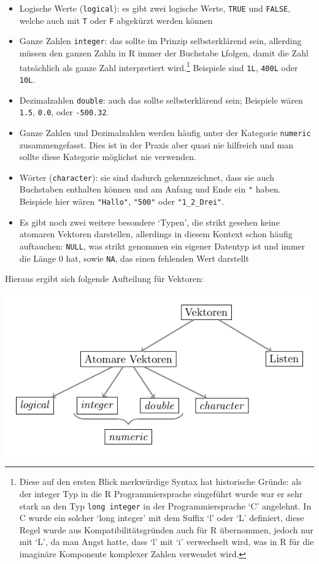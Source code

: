 \documentclass[]{tufte-book}
\providecommand{\tightlist}{%
  \setlength{\itemsep}{0pt}\setlength{\parskip}{0pt}}
\begin{document}
\begin{itemize}
\tightlist
\item
  Logische Werte (\texttt{logical}): es gibt zwei logische Werte,
  \texttt{TRUE} und \texttt{FALSE}, welche auch mit \texttt{T} oder
  \texttt{F} abgekürzt werden können
\item
  Ganze Zahlen \texttt{integer}: das sollte im Prinzip selbsterklärend
  sein, allerding müssen den ganzen Zahln in R immer der Buchstabe
  \texttt{L}folgen, damit die Zahl tatsächlich als ganze Zahl
  interpretiert wird.\footnote{Diese auf den ersten Blick merkwürdige
    Syntax hat historische Gründe: als der integer Typ in die R
    Programmiersprache eingeführt wurde war er sehr stark an den Typ
    \texttt{long\ integer} in der Programmiersprache `C' angelehnt. In C
    wurde ein solcher `long integer' mit dem Suffix `l' oder `L'
    definiert, diese Regel wurde aus Kompatibilitätsgründen auch für R
    übernommen, jedoch nur mit `L', da man Angst hatte, dass `l' mit `i'
    verwechselt wird, was in R für die imaginäre Komponente komplexer
    Zahlen verwendet wird.} Beispiele sind \texttt{1L}, \texttt{400L}
  oder \texttt{10L}.\\
\item
  Dezimalzahlen \texttt{double}: auch das sollte selbsterklärend sein;
  Beispiele wären \texttt{1.5}, \texttt{0.0}, oder \texttt{-500.32}.
\item
  Ganze Zahlen und Dezimalzahlen werden häufig unter der Kategorie
  \texttt{numeric} zusammengefasst. Dies ist in der Praxis aber quasi
  nie hilfreich und man sollte diese Kategorie möglichst nie verwenden.
\item
  Wörter (\texttt{character}): sie sind dadurch gekennzeichnet, dass sie
  auch Buchstaben enthalten können und am Anfang und Ende ein \texttt{"}
  haben. Beispiele hier wären \texttt{"Hallo"}, \texttt{"500"} oder
  \texttt{"1\_2\_Drei"}.
\item
  Es gibt noch zwei weitere besondere `Typen', die strikt gesehen keine
  atomaren Vektoren darstellen, allerdings in diesem Kontext schon
  häufig auftauchen: \texttt{NULL}, was strikt genommen ein eigener
  Datentyp ist und immer die Länge 0 hat, sowie \texttt{NA}, das einen
  fehlenden Wert darstellt
\end{itemize}

Hieraus ergibt sich folgende Aufteilung für Vektoren:

\begin{center}\includegraphics[width=0.8\linewidth]{figures/vector-classification} \end{center}
\end{document}
